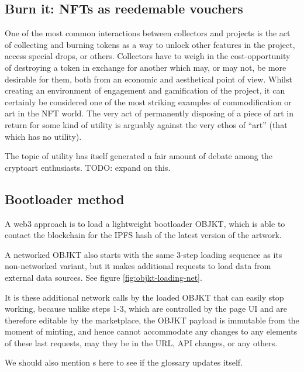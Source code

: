 \subsection{Burn it: NFTs as reedemable vouchers}

One of the most common interactions between collectors and projects is the act of collecting and burning tokens as a way to unlock other features in the project, access special drops, or others. Collectors have to weigh in the cost-opportunity of destroying a token in exchange for another which may, or may not, be more desirable for them, both from an economic and aesthetical point of view. Whilst creating an environment of engagement and gamification of the project, it can certainly be considered one of the most striking examples of commodification or art in the NFT world. The very act of permanently disposing of a piece of art in return for some kind of utility is arguably against the very ethos of ``art'' (that which has no utility).

The topic of utility has itself generated a fair amount of debate among the cryptoart enthusiasts. TODO: expand on this.

\subsection{Bootloader method}

A web3 approach is to load a lightweight bootloader OBJKT, which is able to contact the blockchain for the IPFS hash of the latest version of the artwork.



A networked OBJKT also starts with the same 3-step loading sequence as its non-networked variant, but it makes additional requests to load data from external data sources. See figure \ref{fig:objkt-loading-net}.



It is these additional network calls by the loaded OBJKT that can easily stop working, because unlike steps 1-3, which are controlled by the page UI and are therefore editable by the marketplace, the OBJKT payload is immutable from the moment of minting, and hence cannot accommodate any changes to any elements of these last requests, may they be in the URL, API changes, or any others.

We should also mention s here to see if the glossary updates itself.






